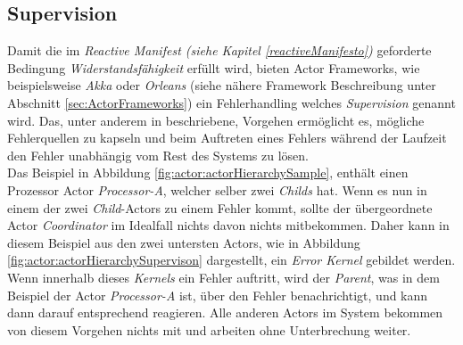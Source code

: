 \subsection{Supervision}\label{actor:supervision}
Damit die im \textit{Reactive Manifest (siehe Kapitel \ref{reactiveManifesto})} geforderte Bedingung \textit{Widerstandsfähigkeit} erfüllt wird, bieten Actor Frameworks, wie beispielsweise \textit{Akka} oder \textit{Orleans} (siehe nähere Framework Beschreibung unter Abschnitt \ref{sec:ActorFrameworks}) ein Fehlerhandling welches \textit{Supervision} genannt wird. Das, unter anderem in \cite{sargent2016play} beschriebene, Vorgehen ermöglicht es, mögliche Fehlerquellen zu kapseln und beim Auftreten eines Fehlers während der Laufzeit den Fehler unabhängig vom Rest des Systems zu lösen.\\
Das Beispiel in Abbildung \ref{fig:actor:actorHierarchySample}, enthält  einen Prozessor Actor \textit{Processor-A}, welcher selber zwei \textit{Childs} hat. Wenn es nun in einem der zwei \textit{Child}-Actors zu einem Fehler kommt, sollte der übergeordnete Actor \textit{Coordinator} im Idealfall nichts davon nichts mitbekommen. Daher kann in diesem Beispiel aus den zwei untersten Actors, wie in Abbildung \ref{fig:actor:actorHierarchySupervison} dargestellt, ein \textit{Error Kernel} gebildet werden. Wenn innerhalb dieses \textit{Kernels} ein Fehler auftritt, wird der \textit{Parent}, was in dem Beispiel der Actor \textit{Processor-A} ist, über den Fehler benachrichtigt, und kann dann darauf entsprechend reagieren. Alle anderen Actors im System bekommen von diesem Vorgehen nichts mit und arbeiten ohne Unterbrechung weiter. \\
